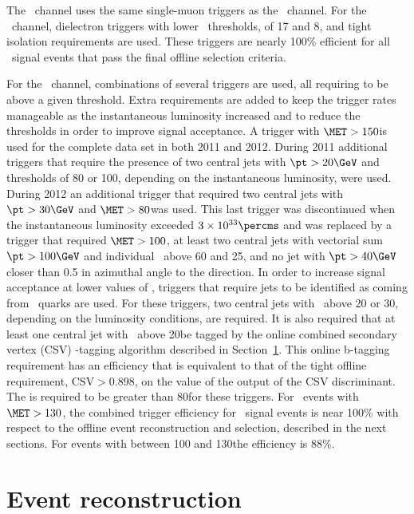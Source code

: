 \documentclass[12pt,twoside,a4paper,cmspaper,final,collab]{cms-tdr}
\begin{document}
The \ZmmH\ channel uses the same single-muon triggers as the \WmnH\
channel. For the \ZeeH\ channel, dielectron triggers with lower \pt\
thresholds, of 17 and 8\GeV, and tight isolation requirements are used.
These triggers are nearly 100\% efficient for all \ZllH\  signal events that pass the
final offline selection criteria.

For the \ZnnH\ channel, combinations of several triggers are
used, all requiring \MET to be
above a given threshold. Extra requirements are added to
keep the trigger rates manageable as the instantaneous luminosity increased and to reduce
the \MET thresholds in order to improve signal
acceptance.
A trigger with $\MET >150$\GeV is used for the complete
data set in both 2011 and 2012. During 2011 additional
triggers that require the
presence of two central jets with $\pt >20\GeV$ and \MET thresholds
of 80 or 100\GeV, depending on the instantaneous luminosity, were used.
During 2012 an additional trigger that
required two central jets with $\pt >30\GeV$ and  $\MET>80$\GeV was used. This last trigger was discontinued when the instantaneous
luminosity exceeded $3\times 10^{33}\percms$
and was replaced by a trigger that required $\MET>100$\GeV,
at least two central jets with vectorial sum $\pt>100\GeV$
and individual \pt\ above 60 and 25\GeV, and no jet
with $\pt>40\GeV$ closer than 0.5 in azimuthal angle to the
\MET direction. In order to increase signal acceptance at lower values of \MET,
triggers that require jets to be identified as coming from \cPqb\ quarks
are used. For these triggers, two central jets with \pt\ above 20 or 30\GeV,
depending on the luminosity conditions, are required. It is also
required that at least one central jet with \pt\ above 20\GeV be
tagged by the online combined secondary vertex (CSV) \cPqb-tagging
algorithm described in
Section~\ref{sec:hbb_Event_Reconstruction}. This online
b-tagging requirement has an efficiency that is equivalent to that of the tight
offline requirement, $\mathrm{CSV} >0.898$, on the value of the output of the CSV discriminant. The \MET is required to
be greater than 80\GeV for these triggers. For \ZnnH\ events with $\MET >130$\GeV, the combined
trigger efficiency for \ZnnH\ signal events is near 100\% with
respect to the offline event reconstruction and selection, described
in the next sections. For events with \MET between 100 and 130\GeV the
efficiency is 88\%.



\section{Event reconstruction}\label{sec:hbb_Event_Reconstruction}
\end{document}
